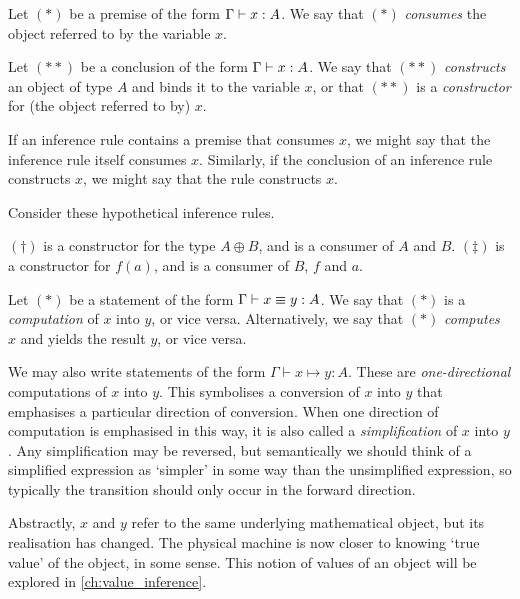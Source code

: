 \documentclass[11pt]{book}
\begin{document}
\begin{defn}
  Let \((\ast)\) be a premise of the form \( \Gamma \vdash x : A \).
  We say that \((\ast)\) \textit{consumes} the object referred to by the variable \( x \).

  Let \((\ast\ast)\) be a conclusion of the form \( \Gamma \vdash x : A \).
  We say that \((\ast\ast)\) \textit{constructs} an object of type \( A \) and binds it to the variable \( x \), or that \((\ast\ast)\) is a \textit{constructor} for (the object referred to by) \( x \).

  If an inference rule contains a premise that consumes \( x \), we might say that the inference rule itself consumes \( x \).
  Similarly, if the conclusion of an inference rule constructs \( x \), we might say that the rule constructs \( x \).
\end{defn}
\begin{egs}
  Consider these hypothetical inference rules.
  \((\dagger)\) is a constructor for the type \( A \oplus B \), and is a consumer of \( A \) and \( B \).
  \((\ddagger)\) is a constructor for \( f(a) \), and is a consumer of \( B \), \( f \) and \( a \).
\end{egs}
\begin{defn}
  Let \((\ast)\) be a statement of the form \( \Gamma \vdash x \equiv y : A \).
  We say that \((\ast)\) is a \textit{computation} of \( x \) into \( y \), or vice versa.
  Alternatively, we say that \((\ast)\) \textit{computes} \( x \) and yields the result \( y \), or vice versa.

  We may also write statements of the form \( \Gamma \vdash x \mapsto y : A \).
  These are \textit{one-directional} computations of \( x \) into \( y \).
  This symbolises a conversion of \( x \) into \( y \) that emphasises a particular direction of conversion.
  When one direction of computation is emphasised in this way, it is also called a \textit{simplification} of \( x \) into \( y \).
  Any simplification may be reversed, but semantically we should think of a simplified expression as `simpler' in some way than the unsimplified expression, so typically the transition should only occur in the forward direction.

  Abstractly, \( x \) and \( y \) refer to the same underlying mathematical object, but its realisation has changed.
  The physical machine is now closer to knowing `true value' of the object, in some sense.
  This notion of values of an object will be explored in \cref{ch:value_inference}.
\end{defn}
\end{document}
